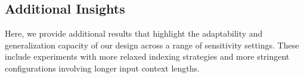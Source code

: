 

\subsection{Additional Insights}
\label{sec:additionalInsights}
Here, we provide additional results that highlight the adaptability and generalization capacity of our design across a range of sensitivity settings. These include experiments with more relaxed indexing strategies and more stringent configurations involving longer input context lengths.



